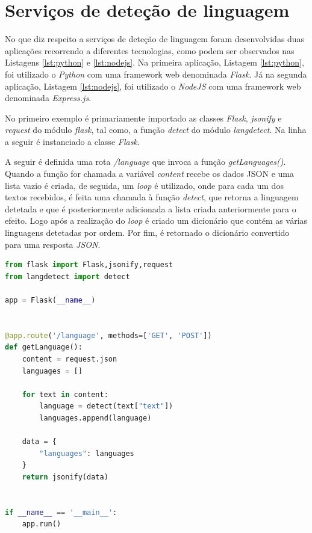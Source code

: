 \section{Serviços de deteção de linguagem}

No que diz respeito a serviços de deteção de linguagem foram desenvolvidas duas aplicações recorrendo a diferentes tecnologias, como podem ser observados nas Listagens \ref{lst:python} e \ref{lst:nodejs}. Na primeira aplicação, Listagem \ref{lst:python}, foi utilizado o \textit{Python} com uma framework web denominada \textit{Flask}. Já na segunda aplicação, Listagem \ref{lst:nodejs},  foi utilizado o \textit{NodeJS} com uma framework web denominada \textit{Express.js}.

No primeiro exemplo é primariamente importado as classes \textit{Flask}, \textit{jsonify} e \textit{request} do módulo \textit{flask}, tal como, a função \textit{detect} do módulo \textit{langdetect}. Na linha a seguir é instanciado a classe \textit{Flask}. 

A seguir é definida uma rota \textit{/language} que invoca a função \textit{getLanguages()}. Quando a função for chamada a variável \textit{content} recebe os dados JSON e uma lista vazio é criada, de seguida, um \textit{loop} é utilizado, onde para cada um dos textos recebidos, é feita uma chamada à função \textit{detect}, que retorna a linguagem detetada e que é posteriormente adicionada a lista criada anteriormente para o efeito. Logo após a realização do \textit{loop} é criado um dicionário que contém as várias linguagens detetadas por ordem. Por fim, é retornado o dicionário convertido para uma resposta \textit{JSON}.

\begin{minipage}{0.9\linewidth}
\begin{lstlisting}[language=python, caption=Serviço de deteção de linguagem., label=lst:python]
from flask import Flask,jsonify,request
from langdetect import detect

app = Flask(__name__)


@app.route('/language', methods=['GET', 'POST'])
def getLanguage():
    content = request.json
    languages = []

    for text in content:
        language = detect(text["text"])
        languages.append(language)

    data = {
        "languages": languages
    }
    return jsonify(data)


if __name__ == '__main__':
    app.run()

\end{lstlisting}
\end{minipage}

